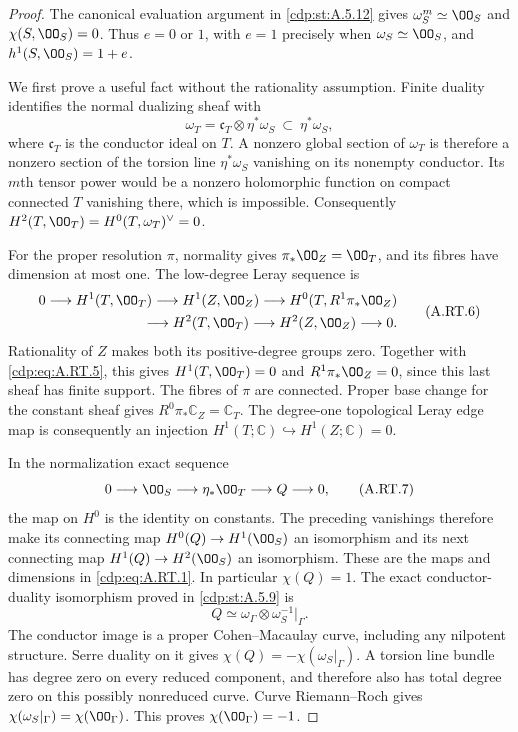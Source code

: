 \begin{proof}
The canonical evaluation argument in \ref{cdp:st:A.5.12} gives
$\omega_S^m\simeq\OO_S$ and $\chi(S,\OO_S)=0$.
Thus $e=0$ or $1$, with $e=1$ precisely when
$\omega_S\simeq\OO_S$, and
$h^1(S,\OO_S)=1+e$.

We first prove a useful fact without the rationality assumption.
Finite duality identifies the normal dualizing sheaf with
\[
 \omega_T=\mathfrak c_T\otimes\eta^*\omega_S
       \ \subset\ \eta^*\omega_S,
\tag{A.RT.5}\label{cdp:eq:A.RT.5}
\]
where $\mathfrak c_T$ is the conductor ideal on $T$.
A nonzero global section of $\omega_T$ is therefore a nonzero
section of the torsion line $\eta^*\omega_S$ vanishing on its
nonempty conductor. Its $m$th tensor power would be a nonzero
holomorphic function on compact connected $T$ vanishing there,
which is impossible. Consequently
$H^2(T,\OO_T)=H^0(T,\omega_T)^\vee=0$.

For the proper resolution $\pi$, normality gives
$\pi_*\OO_Z=\OO_T$, and its fibres have dimension at most one.
The low-degree Leray sequence is
\[
\begin{split}
0\longrightarrow H^1(T,\OO_T)\longrightarrow H^1(Z,\OO_Z)
 \longrightarrow H^0(T,R^1\pi_*\OO_Z)\\
 \longrightarrow H^2(T,\OO_T)\longrightarrow H^2(Z,\OO_Z)
 \longrightarrow0.
\end{split}
\tag{A.RT.6}\label{cdp:eq:A.RT.6}
\]
Rationality of $Z$ makes both its positive-degree groups zero.
Together with \eqref{cdp:eq:A.RT.5}, this gives $H^1(T,\OO_T)=0$ and
$R^1\pi_*\OO_Z=0$, since this last sheaf has finite support.
The fibres of $\pi$ are connected. Proper base change for the
constant sheaf gives $R^0\pi_*\mathbb C_Z=\mathbb C_T$.
The degree-one topological Leray edge map is consequently an
injection $H^1(T;\mathbb C)\hookrightarrow H^1(Z;\mathbb C)=0$.

In the normalization exact sequence
\[
 0\longrightarrow\OO_S\longrightarrow\eta_*\OO_T
       \longrightarrow Q\longrightarrow0,
\tag{A.RT.7}\label{cdp:eq:A.RT.7}
\]
the map on $H^0$ is the identity on constants. The preceding
vanishings therefore make its connecting map
$H^0(Q)\to H^1(\OO_S)$ an isomorphism and its next connecting
map $H^1(Q)\to H^2(\OO_S)$ an isomorphism. These are the
maps and dimensions in \eqref{cdp:eq:A.RT.1}. In particular $\chi(Q)=1$.
The exact conductor-duality isomorphism proved in \ref{cdp:st:A.5.9} is
\[
 Q\simeq\omega_\Gamma\otimes\omega_S^{-1}|_\Gamma.
\tag{A.RT.8}\label{cdp:eq:A.RT.8}
\]
The conductor image is a proper Cohen--Macaulay curve, including
any nilpotent structure. Serre duality on it gives
$\chi(Q)=-\chi(\omega_S|_\Gamma)$. A torsion line bundle has
degree zero on every reduced component, and therefore also has
total degree zero on this possibly nonreduced curve. Curve
Riemann--Roch gives
$\chi(\omega_S|_\Gamma)=\chi(\OO_\Gamma)$.
This proves $\chi(\OO_\Gamma)=-1$.


\end{proof}
